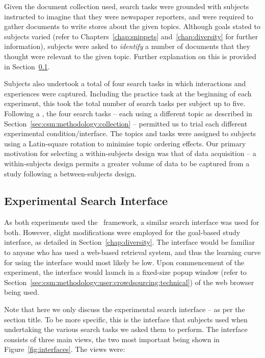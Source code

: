 Given the document collection used, search tasks were grounded with subjects instructed to imagine that they were newspaper reporters, and were required to gather documents to write stores about the given topics. Although goals stated to subjects varied (refer to Chapters~\ref{chap:snippets} and~\ref{chap:diversity} for further information), subjects were asked to \emph{identify} a number of documents that they thought were relevant to the given topic. Further explanation on this is provided in Section~\ref{sec:csm:methodology:user:interface}.

Subjects also undertook a total of four search tasks in which interactions and experiences were captured. Including the practice task at the beginning of each experiment, this took the total number of search tasks per subject up to five. Following a , the four search tasks -- each using a different topic as described in Section~\ref{sec:csm:methodology:collection} -- permitted us to trial each different experimental condition/interface. The topics and tasks were assigned to subjects using a Latin-square rotation to minimise topic ordering effects. Our primary motivation for selecting a within-subjects design was that of data acquisition -- a within-subjects design permits a greater volume of data to be captured from a study following a between-subjects design.

\subsection{Experimental Search Interface}\label{sec:csm:methodology:user:interface}
As both experiments used the \treconomics~framework, a similar search interface was used for both. However, slight modifications were employed for the goal-based study interface, as detailed in Section~\ref{chap:diversity}. The interface would be familiar to anyone who has used a web-based retrieval system, and thus the learning curve for using the interface would most likely be low. Upon commencement of the experiment, the interface would launch in a fixed-size popup window (refer to Section~\ref{sec:csm:methodology:user:crowdsourcing:technical}) of the web browser being used.

Note that here we only discuss the experimental search interface -- as per the section title. To be more specific, this is the interface that subjects used when undertaking the various search tasks we asked them to perform. The interface consists of three main views, the two most important being shown in Figure~\ref{fig:interfaces}. The views were:

